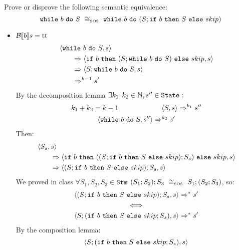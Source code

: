 \begin{exercise}{
    Prove or disprove the following semantic equivalence:
    \[ \wwhile{b}{S}\ \cong_{\text{\tiny SOS}}\ \wwhile{b}{(S;\wif{b}{S}{skip})} \]
}
\begin{itemize}
\begin{itemize}
\begin{itemize}
\begin{align*}
                            \end{align*}
                        \item $\mathcal{B} \llbracket b \rrbracket s = \text{tt}$
                            \begin{align*}
                                &\left<\texttt{while}\ b\ \texttt{do}\ S, s\right>
                                \\&\qquad\Rightarrow \left<\texttt{if}\ b\ \texttt{then}\ (S; \texttt{while}\ b\ \texttt{do}\ S)\ \texttt{else}\ skip, s\right>
                                \\&\qquad\Rightarrow \left<S; \texttt{while}\ b\ \texttt{do}\ S, s\right>
                                \\&\qquad\Rightarrow^{k-1} s'
                            \end{align*}
                            By the decomposition lemma $\exists k_1, k_2 \in \mathbb{N}, s'' \in \texttt{State} :$
                            \begin{gather*}
                                k_1 + k_2 = k - 1 \qquad\qquad\qquad \left<S, s\right> \Rightarrow^{k_1} s'' \\
                                \left<\texttt{while}\ b\ \texttt{do}\ S, s''\right> \Rightarrow^{k_2} s'
                            \end{gather*}
                            Then:
                            \begin{align*}
                                &\left<S_s, s\right>
                                \\&\qquad\Rightarrow \left<\texttt{if}\ b\ \texttt{then}\ ((S;\texttt{if}\ b\ \texttt{then}\ S\ \texttt{else}\ skip);S_s)\ \texttt{else}\ skip, s\right>
                                \\&\qquad\Rightarrow \left<(S;\texttt{if}\ b\ \texttt{then}\ S\ \texttt{else}\ skip);S_s, s\right>
                            \end{align*}
                            We proved in class $\forall S_1, S_2, S_3 \in \texttt{Stm}$ $(S_1;S_2);S_3\ \cong_{\text{\tiny SOS}}\ S_1;(S_2;S_3)$, so:
                            \begin{gather*}
                                \left<(S;\texttt{if}\ b\ \texttt{then}\ S\ \texttt{else}\ skip);S_s, s\right> \Rightarrow^* s'
                                \\
                                \iff
                                \\
                                \left<S;(\texttt{if}\ b\ \texttt{then}\ S\ \texttt{else}\ skip;S_s), s\right> \Rightarrow^* s'
                            \end{gather*}
                            By the composition lemma:
                            \[
                                \left<S;(\texttt{if}\ b\ \texttt{then}\ S\ \texttt{else}\ skip;S_s), s\right>
\]
\end{itemize}
\end{itemize}
\end{itemize}
\end{exercise}
